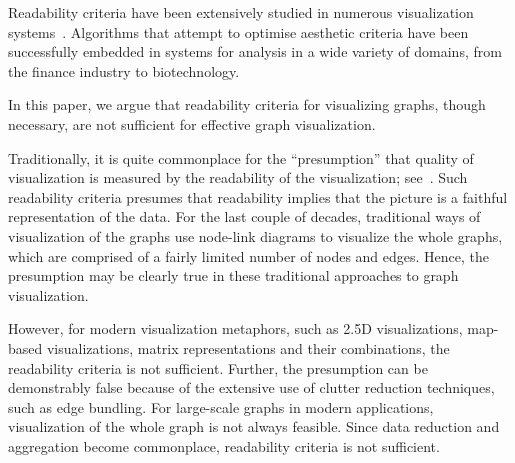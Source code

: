 \documentclass[10pt,journal,cspaper,compsoc]{IEEEtran}
\begin{document}
Readability criteria have been extensively studied in numerous visualization systems~\cite{di,tamassia2013handbook}.  
Algorithms that attempt to optimise aesthetic criteria have been
successfully embedded in systems for analysis in a wide variety of
domains, from the finance industry to biotechnology. 




In this paper, we argue that readability criteria for visualizing
graphs, though necessary, are not sufficient for effective graph
visualization. 

Traditionally, it is quite commonplace for the ``presumption'' that quality of visualization is measured by the readability of the visualization; see~\cite{di,tamassia2013handbook,purchase1996validating,purchase1997aesthetic}. Such readability criteria presumes that readability implies that the picture is a faithful representation of the data. 
For the last couple of decades, traditional ways of visualization of the graphs use node-link diagrams to visualize the whole graphs, which are comprised of a fairly limited number of nodes and edges. 
Hence, the presumption may be clearly true in these traditional approaches to graph visualization.


However, for modern visualization metaphors, such as 2.5D visualizations, map-based visualizations, matrix representations and their combinations, the readability criteria is not sufficient.  Further, the presumption can be demonstrably false because of the extensive use of clutter reduction techniques, such as edge bundling. For large-scale graphs in modern applications, visualization of the whole graph is not always feasible. Since data reduction and aggregation become commonplace, readability criteria is not sufficient.
\end{document}
